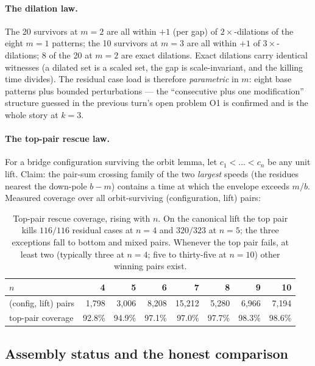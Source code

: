 \documentclass[11pt,a4paper]{article}
\theoremstyle{plain}
\theoremstyle{definition}
\theoremstyle{remark}
\begin{document}
\paragraph{The dilation law.}
The 20 survivors at $m = 2$ are all within $+1$ (per gap) of $2\times$-dilations of the
eight $m = 1$ patterns; the 10 survivors at $m = 3$ are all within $+1$ of
$3\times$-dilations; 8 of the 20 at $m = 2$ are exact dilations. Exact dilations carry
identical witnesses (a dilated set is a scaled set, the gap is scale-invariant, and the
killing time divides). The residual case load is therefore \emph{parametric} in $m$:
eight base patterns plus bounded perturbations --- the ``consecutive plus one
modification'' structure guessed in the previous turn's open problem O1 is confirmed and
is the whole story at $k = 3$.

\paragraph{The top-pair rescue law.}
For a bridge configuration surviving the orbit lemma, let $c_1 < \dots < c_n$ be any
unit lift. Claim: the pair-sum crossing family of the two \emph{largest} speeds (the
residues nearest the down-pole $b - m$) contains a time at which the envelope exceeds
$m/b$. Measured coverage over all orbit-surviving (configuration, lift) pairs:

\begin{table}[ht]
\centering\small
\begin{tabular}{lrrrrrrr}
\toprule
$n$ & 4 & 5 & 6 & 7 & 8 & 9 & 10 \\
\midrule
(config, lift) pairs & 1{,}798 & 3{,}006 & 8{,}208 & 15{,}212 & 5{,}280 & 6{,}966 & 7{,}194 \\
top-pair coverage & 92.8\% & 94.9\% & 97.1\% & 97.0\% & 97.7\% & 98.3\% & 98.6\% \\
\bottomrule
\end{tabular}
\caption{Top-pair rescue coverage, rising with $n$. On the canonical lift the top pair
kills $116/116$ residual cases at $n = 4$ and $320/323$ at $n = 5$; the three exceptions
fall to bottom and mixed pairs. Whenever the top pair fails, at least two (typically
three at $n = 4$; five to thirty-five at $n = 10$) other winning pairs exist.}
\label{tab:rescue}
\end{table}

\subsection{Assembly status and the honest comparison}
\end{document}
